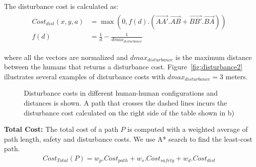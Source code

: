 The disturbance cost is calculated as:
\begin{align} 
\begin{split} 
Cost_{dist}(x,y,a)&=\max(0, f(d).(\vec{AA'}.\vec{AB}+\vec{BB'}.\vec{BA})) \\
f(d)&=\frac{1}{d}-\frac{1}{dmax_{disturbance}}
\end{split} 
\end{align}

where all the vectors are normalized and $dmax_{disturbance}$ is the maximum distance between the humans that returns a disturbance cost. Figure~\ref{fig:disturbance2} illustrates several examples of disturbance costs with $dmax_{disturbance}=3$ meters.

\begin{figure}[ht!]
\centering
%
    \caption{%
	Disturbance costs in different human-human configurations and distances is shown. A path that crosses the dashed lines incurs the disturbance cost calculated on the right side of the table shown in b)
     }%
   \label{fig:disturbance}
   \vspace{-0.2cm}
\end{figure}

\textbf{Total Cost:} The total cost of a path $P$ is computed with a weighted average of path length, safety and disturbance costs. We use A* search to find the least-cost path.
\begin{align}
Cost_{Total}(P) = w_{p}.Cost_{path}+w_{s}.Cost_{safety} + w_d.Cost_{dist}
\end{align}

